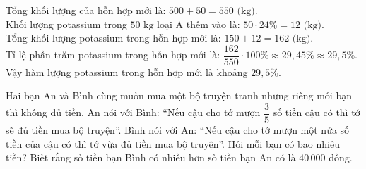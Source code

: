 \begin{bt}
{\begin{enumerate}[a)]
    Tổng khối lượng của hỗn hợp mới là:
    $500 + 50 = 550\text{ (kg)}$.\\
    Khối lượng potassium trong $50\text{ kg}$ loại A thêm vào là:
    $50 \cdot 24\% = 12\text{ (kg)}$.\\
    Tổng khối lượng potassium trong hỗn hợp mới là:
    $150 + 12 = 162\text{ (kg)}$.\\
    Tỉ lệ phần trăm potassium trong hỗn hợp mới là:
    $\dfrac{162}{550} \cdot 100\% \approx 29{,}45\% \approx 29{,}5\%$.\\
    Vậy hàm lượng potassium trong hỗn hợp mới là khoảng $29{,}5\%$.
\end{enumerate}
}
\end{bt}

\begin{bt}%
Hai bạn An và Bình cùng muốn mua một bộ truyện tranh nhưng riêng mỗi bạn thì không đủ tiền.
An nói với Bình: ``Nếu cậu cho tớ mượn $\dfrac{3}{5}$ số tiền cậu có thì tớ sẽ đủ tiền mua bộ truyện''.
Bình nói với An: ``Nếu cậu cho tớ mượn một nửa số tiền của cậu có thì tớ vừa đủ tiền mua bộ truyện''.
Hỏi mỗi bạn có bao nhiêu tiền? Biết rằng số tiền bạn Bình có nhiều hơn số tiền bạn An có là $40\,000$ đồng.
\end{bt}


